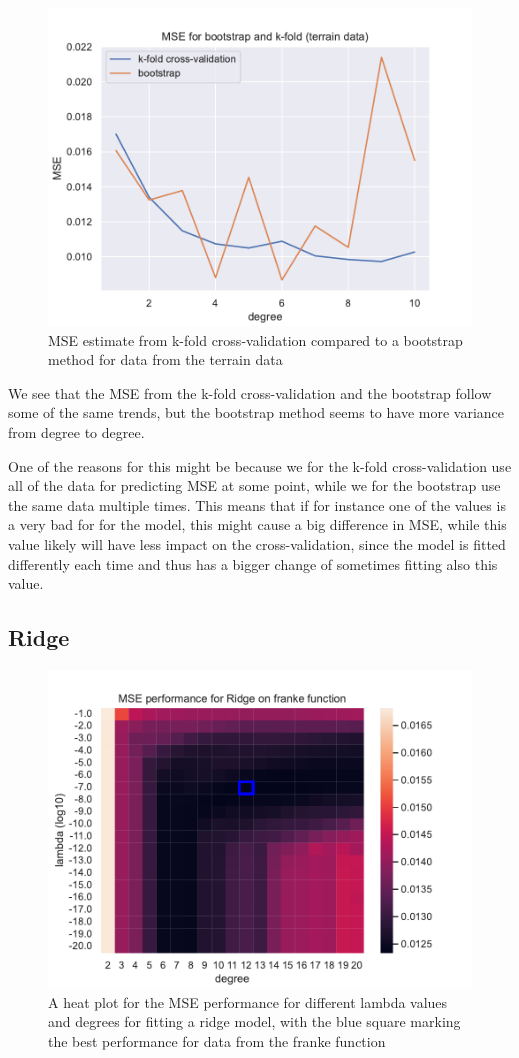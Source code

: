 \documentclass[12pt]{article}
\begin{document}
\begin{figure}[H]
    \centering
    \includegraphics[width=0.7\columnwidth]{../src/output/bootstrap_cross_validation_terrain_data.pdf}
    \caption{MSE estimate from k-fold cross-validation compared to a bootstrap method for data from the terrain data}
    \label{fig:bootstrap_cross_validation_terrain}
\end{figure}

We see that the MSE from the k-fold cross-validation and the bootstrap follow some of the same trends, but the bootstrap method seems to have more variance from degree to degree.

One of the reasons for this might be because we for the k-fold cross-validation use all of the data for predicting MSE at some point, while we for the bootstrap use the same data multiple times.
This means that if for instance one of the values is a very bad for for the model, this might cause a big difference in MSE, while this value likely will have less impact on the cross-validation, since the model is fitted differently each time and thus has a bigger change of sometimes fitting also this value.

\subsection{Ridge}

\begin{figure}[H]
    \centering
    \includegraphics[width=0.8\columnwidth]{../src/output/mse_heat_plot_franke_function_Ridge.pdf}
    \caption{A heat plot for the MSE performance for different lambda values and degrees for fitting a ridge model, with the blue square marking the best performance for data from the franke function}
    \label{fig:mse_heat_map_franke_ridge}
\end{figure}
\end{document}
